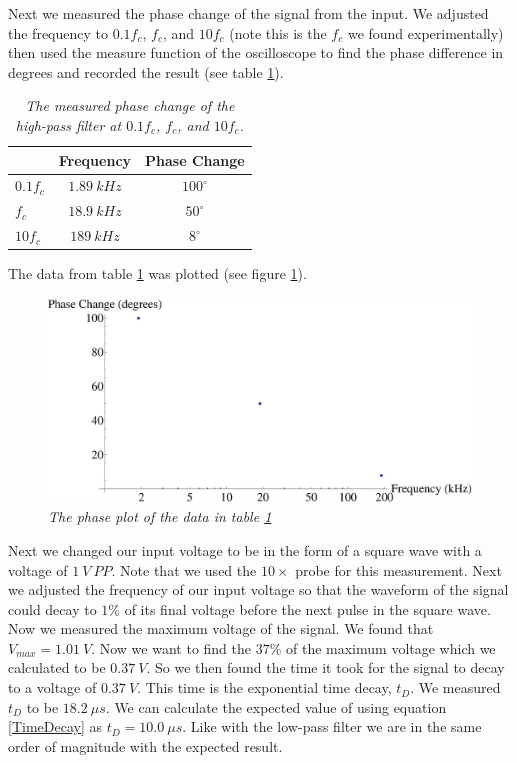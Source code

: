 \documentclass[11pt]{article}
\numberwithin{equation}{section}
\numberwithin{figure}{section}
\numberwithin{table}{section}
\begin{document}
Next we measured the phase change of the signal from the input. We adjusted the frequency to $0.1f_c$, $f_c$, and $10f_c$ (note this is the $f_c$ we found experimentally) then used the measure function of the oscilloscope to find the phase difference in degrees and recorded the result (see table \ref{HighPassPhase}).
\begin{table}[h]
\centering
\begin{tabular}{lcc}
		&Frequency	&Phase Change	\\
\hline
$0.1f_c$	&$1.89\ kHz$	&$100^{\circ}$\\
$f_c$		&$18.9\ kHz$	&$50^{\circ}$\\
$10f_c$		&$189\ kHz$	&$8^{\circ}$\\
\end{tabular}
\caption{\textit{The measured phase change of the high-pass filter at $0.1f_c$, $f_c$, and $10f_c$.}}
\label{HighPassPhase}
\end{table}
The data from table \ref{HighPassPhase} was plotted (see figure \ref{PlotHighPassPhase}).
\begin{figure}[h]
\centering
\includegraphics[scale=0.60]{PlotHighPassPhase.eps}
\caption{\textit{The phase plot of the data in table \ref{HighPassPhase}}}
\label{PlotHighPassPhase}
\end{figure}

Next we changed our input voltage to be in the form of a square wave with a voltage of $1\ V\ PP$. Note that we used the $10\times$ probe for this measurement. Next we adjusted the frequency of our input voltage so that the waveform of the signal could decay to $1\%$ of its final voltage before the next pulse in the square wave. Now we measured the maximum voltage of the signal. We found that $V_{max} = 1.01\ V$. Now we want to find the $37\%$ of the maximum voltage which we calculated to be $0.37\ V$. So we then found the time it took for the signal to decay to a voltage of $0.37\ V$. This time is the exponential time decay, $t_D$. We measured $t_D$ to be $18.2\ \mu s$. We can calculate the expected value of using equation \ref{TimeDecay} as $t_D = 10.0\ \mu s$. Like with the low-pass filter we are in the same order of magnitude with the expected result.
\end{document}
